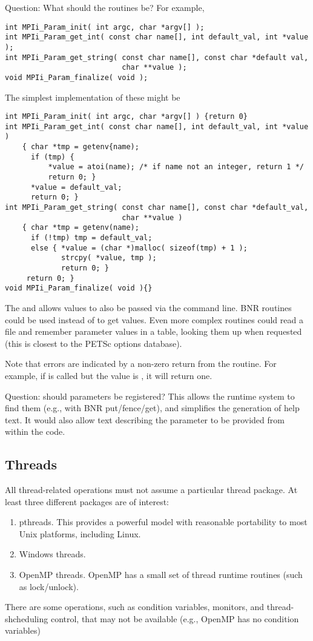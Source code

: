 \documentclass{article}
\begin{document}
Question: What should the routines be?  For 
example,
\begin{verbatim}
int MPIi_Param_init( int argc, char *argv[] );
int MPIi_Param_get_int( const char name[], int default_val, int *value );
int MPIi_Param_get_string( const char name[], const char *default val,
                           char **value );
void MPIi_Param_finalize( void );
\end{verbatim}
The simplest implementation of these might be
\begin{verbatim}
int MPIi_Param_init( int argc, char *argv[] ) {return 0}
int MPIi_Param_get_int( const char name[], int default_val, int *value ) 
    { char *tmp = getenv{name); 
      if (tmp) { 
          *value = atoi(name); /* if name not an integer, return 1 */
          return 0; }
      *value = default_val; 
      return 0; }
int MPIi_Param_get_string( const char name[], const char *default_val,
                           char **value ) 
    { char *tmp = getenv(name); 
      if (!tmp) tmp = default_val; 
      else { *value = (char *)malloc( sizeof(tmp) + 1 ); 
             strcpy( *value, tmp );
             return 0; }
     return 0; }
void MPIi_Param_finalize( void ){}
\end{verbatim}
The  and  allows
values to also be passed via the command line.  BNR routines could be
used instead of  to get values.  Even more complex
routines could read a  file and remember parameter
values in a table, looking them up when requested (this is closest to
the PETSc options database).

Note that errors are indicated by a non-zero return from the routine.
For example, if  is called but the value
is , it will return one.

Question: should parameters be registered?  This allows the runtime
system to find them (e.g., with BNR put/fence/get), and simplifies the
generation of help text.  It 
would also allow text describing the parameter to be provided from
within the code.

\subsection{Threads}
\label{sec:threads}
All thread-related operations must not assume a particular thread
package.  At least three different packages are of interest:
\begin{enumerate}
\item pthreads.  This provides a powerful model with reasonable
portability to most Unix platforms, including Linux.  
\item Windows threads.  
\item OpenMP threads.  OpenMP has a small set of thread runtime
routines (such as lock/unlock).  
\end{enumerate}
There are some operations, such as condition variables, monitors, and
thread-shcheduling control, that may not be available (e.g., OpenMP
has no condition variables)  
\end{document}
